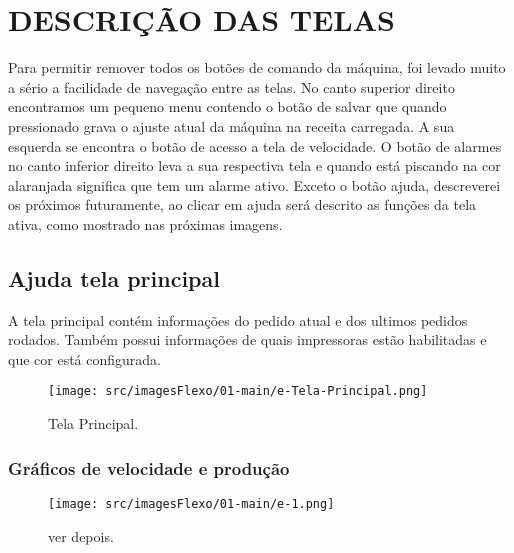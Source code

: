 \thispagestyle{fancy}

\vspace*{\fill}


\section{\MakeUppercase{\large{Descrição das telas}}}

Para permitir remover todos os botões de comando da máquina, foi levado muito a sério a facilidade de navegação entre as telas.
No canto superior direito encontramos um pequeno menu contendo o botão de salvar que quando pressionado grava o ajuste atual da máquina na receita carregada. A sua esquerda se encontra o botão de acesso a tela de velocidade. O botão de alarmes no canto inferior direito leva a sua respectiva tela e quando está piscando na cor alaranjada significa que tem um alarme ativo. Exceto o botão ajuda, descreverei os próximos futuramente, ao clicar em ajuda será descrito as funções da tela ativa, como mostrado nas próximas imagens.

\subsection{Ajuda tela principal}

A tela principal contém informações do pedido atual e dos ultimos pedidos rodados. Também
possui informações de quais impressoras estão habilitadas e que cor está configurada.

\begin{figure}[h]
    \centering
    \texttt{[image: src/imagesFlexo/01-main/e-Tela-Principal.png]}
    \caption{Tela Principal.}
    \label{}
\end{figure}

\newpage
\thispagestyle{fancy}

\vspace*{\fill}

\subsubsection{\small{Gráficos de velocidade e produção}}


\begin{figure}[h]
    \centering
    \texttt{[image: src/imagesFlexo/01-main/e-1.png]}
    \caption{ver depois.}
    \label{}
\end{figure}

\vspace*{\fill}

